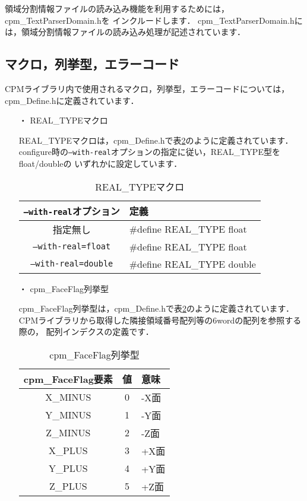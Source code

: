 領域分割情報ファイルの読み込み機能を利用するためには，cpm\_TextParserDomain.hを
インクルードします．
cpm\_TextParserDomain.hには，領域分割情報ファイルの読み込み処理が記述されています．


\subsection{マクロ，列挙型，エラーコード}

CPMライブラリ内で使用されるマクロ，列挙型，エラーコードについては，
cpm\_Define.hに定義されています．


\begin{itemize}
\item[・] {REAL\_TYPEマクロ}

REAL\_TYPEマクロは，cpm\_Define.hで表\ref{tbl:FaceFlag}のように定義されています．\\
configure時の{\tt --with-real}オプションの指定に従い，REAL\_TYPE型をfloat/doubleの
いずれかに設定しています．\\

\begin{table}[htb]
\begin{center}
\caption{REAL\_TYPEマクロ}
\label{tbl:realtype}
\begin{tabular}{|c|l|}
\hline 
{\tt --with-real}オプション & 定義\\
\hline
指定無し & \#define REAL\_TYPE float \\
{\tt --with-real=float} & \#define REAL\_TYPE float \\
{\tt --with-real=double} & \#define REAL\_TYPE double \\
\hline   
\end{tabular}
\end{center}
\end{table}


\item[・] {cpm\_FaceFlag列挙型}

cpm\_FaceFlag列挙型は，cpm\_Define.hで表\ref{tbl:FaceFlag}のように定義されています．\\
CPMライブラリから取得した隣接領域番号配列等の6wordの配列を参照する際の，
配列インデクスの定義です．\\

\begin{table}[htb]
\begin{center}
\caption{cpm\_FaceFlag列挙型}
\label{tbl:FaceFlag}
\begin{tabular}{|c|c|l|}
\hline 
cpm\_FaceFlag要素 & 値 & 意味\\
\hline
X\_MINUS & 0 & -X面\\
Y\_MINUS & 1 & -Y面\\
Z\_MINUS & 2 & -Z面\\
X\_PLUS  & 3 & +X面\\
Y\_PLUS  & 4 & +Y面\\
Z\_PLUS  & 5 & +Z面\\
\hline
\end{tabular}
\end{center}
\end{table}



\end{itemize}

